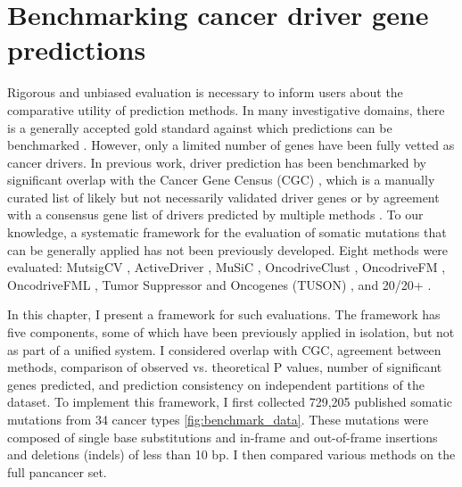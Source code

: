 
\chapter{Benchmarking cancer driver gene predictions}
\label{chap:ch4}

Rigorous and unbiased evaluation is necessary to inform users about the comparative utility of prediction methods. In many investigative domains, there is a generally accepted gold standard against which predictions can be benchmarked \cite{RN102, RN103}. However, only a limited number of genes have been fully vetted as cancer drivers. In previous work, driver prediction has been benchmarked by significant overlap with the Cancer Gene Census (CGC) \cite{RN91}, which is a manually curated list of likely but not necessarily validated driver genes \cite{RN54, RN53} or by agreement with a consensus gene list of drivers predicted by multiple methods \cite{RN96}. To our knowledge, a systematic framework for the evaluation of somatic mutations that can be generally applied has not been previously developed. Eight methods were evaluated: MutsigCV \cite{RN13}, ActiveDriver \cite{RN98}, MuSiC \cite{RN43}, OncodriveClust \cite{RN54}, OncodriveFM \cite{RN53}, OncodriveFML \cite{RN86}, Tumor Suppressor and Oncogenes (TUSON) \cite{RN71}, and 20/20+ \cite{RN70}. 

In this chapter, I present a framework for such evaluations. The framework has five components, some of which have been previously applied in isolation, but not as part of a unified system. I considered overlap with CGC, agreement between methods, comparison of observed vs. theoretical P values, number of significant genes predicted, and prediction consistency on independent partitions of the dataset. To implement this framework, I first collected 729,205 published somatic mutations from 34 cancer types \cite{RN14, RN71} \autoref{fig:benchmark_data}. These mutations were composed of single base substitutions and in-frame and out-of-frame insertions and deletions (indels) of less than 10 bp. I then compared various methods on the full pancancer set.

